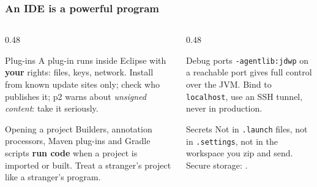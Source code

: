 \documentclass[aspectratio=169,10pt,compress]{beamer}
\begin{document}




\begin{frame}[t,fragile] \frametitle{An IDE is a powerful program}
  \begin{columns}[T]
    \begin{column}{0.48\textwidth}
      \begin{block}{Plug-ins}
        \small A plug-in runs inside Eclipse with \textbf{your} rights: files, keys, network. Install from known
        update sites only; check who publishes it; p2 warns about \emph{unsigned content}: take it seriously.
      \end{block}
      \begin{block}{Opening a project}
        \small Builders, annotation processors, Maven plug-ins and Gradle scripts \textbf{run code} when a project is
        imported or built. Treat a stranger's project like a stranger's program.
      \end{block}
    \end{column}
    \begin{column}{0.48\textwidth}
      \begin{block}{Debug ports}
        \small \texttt{-agentlib:jdwp} on a reachable port gives full control over the JVM. Bind to \texttt{localhost},
        use an SSH tunnel, never in production.
      \end{block}
      \begin{block}{Secrets}
        \small Not in \texttt{.launch} files, not in \texttt{.settings}, not in the workspace you zip and send.
        Secure storage: .
      \end{block}
    \end{column}
  \end{columns}
\end{frame}

\end{document}

